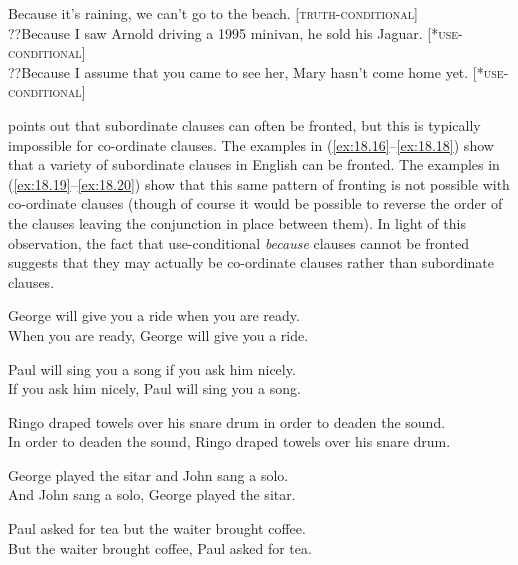 \ea \label{ex:18.15}
\ea   Because it’s raining, we can’t go to the beach. \hfill [\textsc{truth-conditional}]\\
\ex ??Because I saw Arnold driving a 1995 minivan, he sold his Jaguar. \hfill [*\textsc{use-conditional}]\\
\ex ??Because I assume that you came to see her, Mary hasn’t come home yet. \hfill [*\textsc{use-conditional}]
                       \z
\z


\citet{Haspelmath1995} points out that subordinate clauses can often be fronted, but this is typically impossible for co-ordinate clauses. The examples in (\ref{ex:18.16}--\ref{ex:18.18}) show that a variety of subordinate clauses in English can be fronted. The examples in (\ref{ex:18.19}--\ref{ex:18.20}) show that this same pattern of fronting is not possible with co-ordinate clauses (though of course it would be possible to reverse the order of the clauses leaving the conjunction in place between them). In light of this observation, the fact that use-conditional \textit{because} clauses cannot be fronted suggests that they may actually be co-ordinate clauses rather than subordinate clauses.


\ea \label{ex:18.16}
\ea  George will give you a ride when you are ready.\\
\ex When you are ready, George will give you a ride.
                       \z
\z

\ea \label{ex:18.17}
\ea  Paul will sing you a song if you ask him nicely.\\
\ex If you ask him nicely, Paul will sing you a song.
\z \z

\ea \label{ex:18.18}
\ea  Ringo draped towels over his snare drum in order to deaden the sound.\\
\ex In order to deaden the sound, Ringo draped towels over his snare drum.
                       \z
\z

\ea \label{ex:18.19}
\ea  George played the sitar and John sang a solo.\\
\ex *And John sang a solo, George played the sitar.
                       \z
\z

\ea \label{ex:18.20}
\ea  Paul asked for tea but the waiter brought coffee.\\
\ex *But the waiter brought coffee, Paul asked for tea.
                       \z
\z


